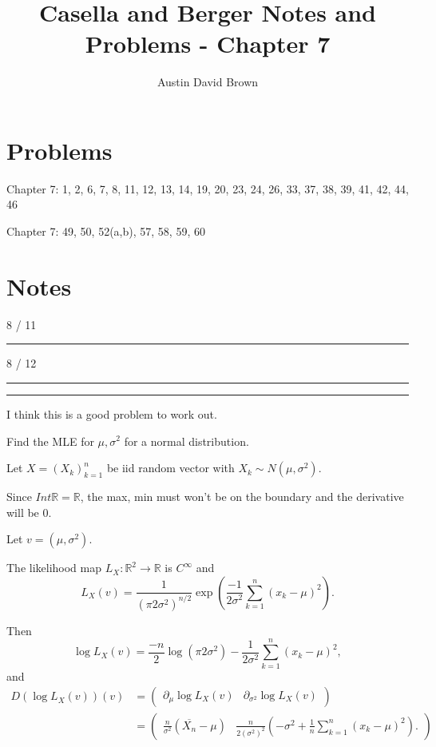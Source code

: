 \documentclass[12pt, reqno]{amsart}
\numberwithin{equation}{section}
\newcommand{\R}{\mathbb{R}}
\newcommand{\mean}{\overline}
\begin{document}
\title{Casella and Berger Notes and Problems -  Chapter 7}
\author{Austin David Brown}
\maketitle

\section{Problems}

Chapter 7: 1, 2, 6, 7, 8, 11, 12, 13, 14, 19, 20, 23, 24, 26, 33, 37, 38, 39, 41, 42, 44, 46

Chapter 7: 49, 50, 52(a,b), 57, 58, 59, 60



\section{Notes}

8 / 11
\rule{\textwidth}{.5pt}


8 / 12
\rule{\textwidth}{.5pt}

\rule{\textwidth}{.5pt}

I think this is a good problem to work out.

Find the MLE for $\mu, \sigma^2$ for a normal distribution.

Let $X = (X_k)_{k = 1}^n$ be iid random vector with  $X_k \sim N(\mu, \sigma^2)$.

Since $Int \R = \R$, the max, min must won't be on the boundary and the derivative will be $0.$

Let $v = (\mu, \sigma^2).$

The likelihood map $L_X : \R^2 \to \R$ is $C^\infty$ and
\[
L_X(v) = \frac{1}{(\pi 2 \sigma^2)^{n/2}} \exp( \frac{-1}{2 \sigma^2} \sum_{k = 1}^n (x_k - \mu)^2).
\]

Then
\[
\log L_X(v) = \frac{-n}{2} \log (\pi 2 \sigma^2) - \frac{1}{2 \sigma^2} \sum_{k = 1}^n (x_k - \mu)^2,
\]
and
\begin{align*}
D(\log L_X(v)) (v)
&=  \begin{pmatrix}
\partial_{\mu} \log L_X(v)
&
\partial_{\sigma^2} \log L_X(v)
\end{pmatrix} \\
&=  \begin{pmatrix}
\frac{n}{\sigma^2} (\mean{X_n} - \mu)
&
\frac{n}{2 (\sigma^2)^2} ( -\sigma^2 + \frac{1}{n} \sum_{k = 1}^n (x_k - \mu)^2 ).
\end{pmatrix} 
\end{align*}
\end{document}
